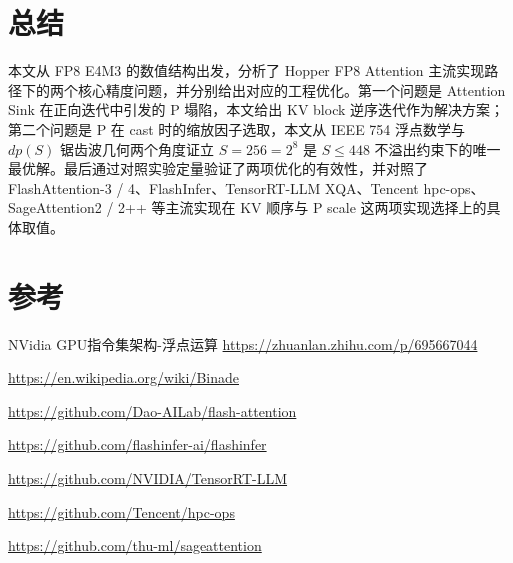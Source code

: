 \section{总结}

本文从 FP8 E4M3 的数值结构出发，分析了 Hopper FP8 Attention 主流实现路径下的两个核心精度问题，并分别给出对应的工程优化。第一个问题是 Attention Sink 在正向迭代中引发的 P 塌陷，本文给出 KV block 逆序迭代作为解决方案；第二个问题是 P 在 cast 时的缩放因子选取，本文从 IEEE 754 浮点数学与 $dp(S)$ 锯齿波几何两个角度证立 $S = 256 = 2^8$ 是 $S \le 448$ 不溢出约束下的唯一最优解。最后通过对照实验定量验证了两项优化的有效性，并对照了 FlashAttention-3 / 4、FlashInfer、TensorRT-LLM XQA、Tencent hpc-ops、SageAttention2 / 2++ 等主流实现在 KV 顺序与 P scale 这两项实现选择上的具体取值。

\section{参考}

NVidia GPU指令集架构-浮点运算 \url{https://zhuanlan.zhihu.com/p/695667044}

\url{https://en.wikipedia.org/wiki/Binade}

\url{https://github.com/Dao-AILab/flash-attention}

\url{https://github.com/flashinfer-ai/flashinfer}

\url{https://github.com/NVIDIA/TensorRT-LLM}

\url{https://github.com/Tencent/hpc-ops}

\url{https://github.com/thu-ml/sageattention}
